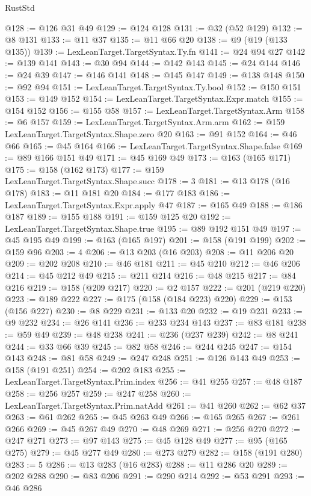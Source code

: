 \begin{lexlean}{RustStd}
\begin{coremodule}
@128 := @126 @31 @49
@129 := @124 @128
@131 := @32 (@52 @129)
@132 := @8 @131
@133 := @11 @37
@135 := @11 @66 @20
@138 := @9 (@19 (@133 @135))
@139 := LexLeanTarget.TargetSyntax.Ty.fn
@141 := @24 @94 @27
@142 := @139 @141
@143 := @30 @94
@144 := @142 @143
@145 := @24 @144
@146 := @24 @39
@147 := @146 @141
@148 := @145 @147
@149 := @138 @148
@150 := @92 @94
@151 := LexLeanTarget.TargetSyntax.Ty.bool
@152 := @150 @151
@153 := @149 @152
@154 := LexLeanTarget.TargetSyntax.Expr.match
@155 := @154 @152
@156 := @155 @58
@157 := LexLeanTarget.TargetSyntax.Arm
@158 := @6 @157
@159 := LexLeanTarget.TargetSyntax.Arm.arm
@162 := @159 LexLeanTarget.TargetSyntax.Shape.zero @20
@163 := @91 @152
@164 := @46 @66
@165 := @45 @164
@166 := LexLeanTarget.TargetSyntax.Shape.false
@169 := @89 @166 @151 @49
@171 := @45 @169 @49
@173 := @163 (@165 @171)
@175 := @158 (@162 @173)
@177 := @159 LexLeanTarget.TargetSyntax.Shape.succ
@178 := 3
@181 := @13 @178 (@16 @178)
@183 := @11 @181 @20
@184 := @177 @183
@186 := LexLeanTarget.TargetSyntax.Expr.apply @47
@187 := @165 @49
@188 := @186 @187
@189 := @155 @188
@191 := @159 @125 @20
@192 := LexLeanTarget.TargetSyntax.Shape.true
@195 := @89 @192 @151 @49
@197 := @45 @195 @49
@199 := @163 (@165 @197)
@201 := @158 (@191 @199)
@202 := @159 @96
@203 := 4
@206 := @13 @203 (@16 @203)
@208 := @11 @206 @20
@209 := @202 @208
@210 := @46 @181
@211 := @45 @210
@212 := @46 @206
@214 := @45 @212 @49
@215 := @211 @214
@216 := @48 @215
@217 := @84 @216
@219 := @158 (@209 @217)
@220 := @2 @157
@222 := @201 (@219 @220)
@223 := @189 @222
@227 := @175 (@158 (@184 @223) @220)
@229 := @153 (@156 @227)
@230 := @8 @229
@231 := @133 @20
@232 := @19 @231
@233 := @9 @232
@234 := @26 @141
@236 := @233 @234 @143
@237 := @83 @181
@238 := @59 @49
@239 := @48 @238
@241 := @236 (@237 @239)
@242 := @8 @241
@244 := @33 @66 @39
@245 := @82 @58
@246 := @244 @245
@247 := @154 @143
@248 := @81 @58
@249 := @247 @248
@251 := @126 @143 @49
@253 := @158 (@191 @251)
@254 := @202 @183
@255 := LexLeanTarget.TargetSyntax.Prim.index
@256 := @41 @255
@257 := @48 @187
@258 := @256 @257
@259 := @247 @258
@260 := LexLeanTarget.TargetSyntax.Prim.natAdd
@261 := @41 @260
@262 := @62 @37
@263 := @61 @262
@265 := @45 @263 @49
@266 := @165 @265
@267 := @261 @266
@269 := @45 @267 @49
@270 := @48 @269
@271 := @256 @270
@272 := @247 @271
@273 := @97 @143
@275 := @45 @128 @49
@277 := @95 (@165 @275)
@279 := @45 @277 @49
@280 := @273 @279
@282 := @158 (@191 @280)
@283 := 5
@286 := @13 @283 (@16 @283)
@288 := @11 @286 @20
@289 := @202 @288
@290 := @83 @206
@291 := @290 @214
@292 := @53 @291
@293 := @46 @286

\end{coremodule}
\end{lexlean}
